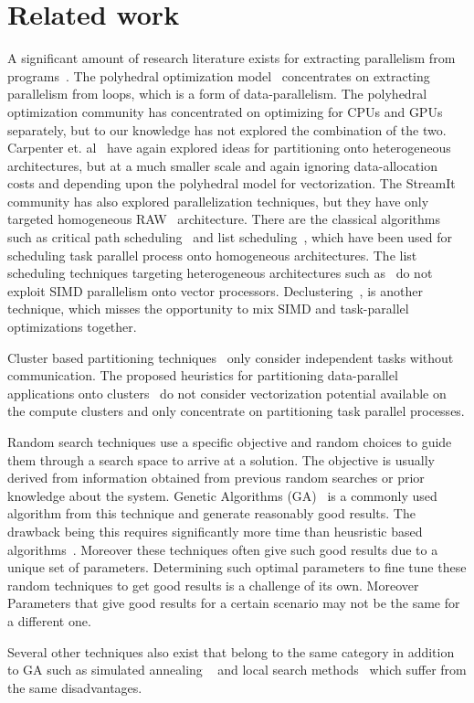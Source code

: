 \section{Related work}
\label{sec:related-work}

A significant amount of research literature exists for extracting
parallelism from programs~\cite{mgri98,jdon06,mgor06,gsih93,pcar09}. The
polyhedral optimization model~\cite{mgri98} concentrates on extracting
parallelism from loops, which is a form of data-parallelism. The
polyhedral optimization community has concentrated on optimizing for
CPUs and GPUs separately, but to our knowledge has not explored the
combination of the two. Carpenter et. al~\cite{pcar09} have again
explored ideas for partitioning onto heterogeneous architectures, but at
a much smaller scale and again ignoring data-allocation costs and
depending upon the polyhedral model for vectorization. The
StreamIt~\cite{wthi02} community has also explored parallelization
techniques, but they have only targeted homogeneous RAW~\cite{ewai97}
architecture. There are the classical algorithms such as critical path
scheduling~\cite{Kohler1975} and list scheduling~\cite{atho74}, which
have been used for scheduling task parallel process onto homogeneous
architectures. The list scheduling techniques targeting heterogeneous
architectures such as~\cite{htop02} do not exploit SIMD parallelism onto
vector processors. Declustering~\cite{gsih93}, is another technique,
which misses the opportunity to mix SIMD and task-parallel optimizations
together.

Cluster based partitioning techniques~\cite{mmah99,adou04,tbra01} only
consider independent tasks without communication. The proposed
heuristics for partitioning data-parallel applications onto
clusters~\cite{ssan05,skum02} do not consider vectorization potential
available on the compute clusters and only concentrate on partitioning
task parallel processes.

Random search techniques use a specific objective and random
choices to guide them through a search space to arrive at a solution. The
objective is usually derived from information obtained from previous random
searches or prior knowledge about the system. Genetic Algorithms
(GA)~\cite{265940,shroff1996genetic,singh1995mapping,wang1996genetic} is a
commonly used algorithm from this technique and generate reasonably good
results. The drawback being this requires significantly more time than
heusristic based algorithms~\cite{tbra01}. Moreover these techniques often give
such good results due to a unique set of parameters. Determining such optimal
parameters to fine tune these random techniques to get good results is a
challenge of its own. Moreover Parameters that give good results for a certain
scenario may not be the same for a different one.

Several other techniques also exist that belong to the same category in
addition to GA such as simulated annealing ~\cite{shroff1996genetic,664363} and
local search methods~\cite{622584,537394} which suffer from the same
disadvantages.



